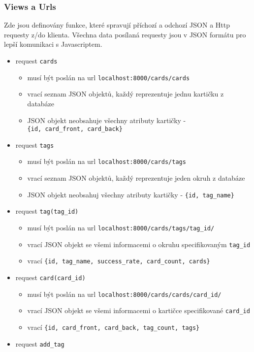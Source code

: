 \documentclass[11pt]{article}
\providecommand{\tightlist}{\setlength{\itemsep}{1pt}\setlength{\parskip}{1pt}}
\let\oldtexttt\texttt
\renewcommand{\texttt}[1]{\oldtexttt{\textcolor{codehighlight}{#1}}}
\begin{document}
\hypertarget{views-a-urls}{%
\subsubsection{Views a Urls}\label{views-a-urls}}

Zde jsou definovány funkce, které spravují příchozí a odchozí JSON a
Http requesty z/do klienta. Všechna data posílaná requesty jsou v JSON
formátu pro lepší komunikaci s Javascriptem.

\begin{itemize}
\tightlist
\item
  request \texttt{cards}

  \begin{itemize}
  \tightlist
  \item
    musí být poslán na url \texttt{localhost:8000/cards/cards}
  \item
    vrací seznam JSON objektů, každý reprezentuje jednu kartičku z
    databáze
  \item
    JSON objekt neobsahuje všechny atributy kartičky -
    \texttt{\{id,\ card\_front,\ card\_back\}}
  \end{itemize}
\item
  request \texttt{tags}

  \begin{itemize}
  \tightlist
  \item
    musí být poslán na url \texttt{localhost:8000/cards/tags}
  \item
    vrací seznam JSON objektů, každý reprezentuje jeden okruh z databáze
  \item
    JSON objekt neobsahuj všechny atributy kartičky -
    \texttt{\{id,\ tag\_name\}}
  \end{itemize}
\item
  request \texttt{tag(tag\_id)}

  \begin{itemize}
  \tightlist
  \item
    musí být poslán na url \texttt{localhost:8000/cards/tags/tag\_id/}
  \item
    vrací JSON objekt se všemi informacemi o okruhu specifikovaným
    \texttt{tag\_id}
  \item
    vrací
    \texttt{\{id,\ tag\_name,\ success\_rate,\ card\_count,\ cards\}}
  \end{itemize}
\item
  request \texttt{card(card\_id)}

  \begin{itemize}
  \tightlist
  \item
    musí být poslán na url \texttt{localhost:8000/cards/cards/card\_id/}
  \item
    vrací JSON objekt se všemi informacemi o kartičce specifikované
    \texttt{card\_id}
  \item
    vrací \texttt{\{id,\ card\_front,\ card\_back,\ tag\_count,\ tags\}}
  \end{itemize}
\item
  request \texttt{add\_tag}


\end{itemize}
\end{document}
